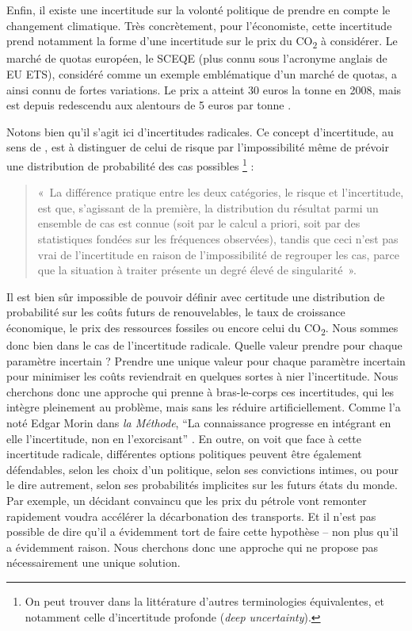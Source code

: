 Enfin, il existe une incertitude sur la volonté politique de prendre en compte le changement climatique. Très concrètement, pour l’économiste, cette incertitude prend notamment la forme d’une incertitude sur le prix du CO\textsubscript{2} à considérer. Le marché de quotas européen, le SCEQE (plus connu sous l’acronyme anglais de EU ETS), considéré comme un exemple emblématique d’un marché de quotas, a ainsi connu de fortes variations. Le prix a atteint 30 euros la tonne en 2008, mais est depuis redescendu aux alentours de 5 euros par tonne \citep{Marcu2016}.

Notons bien qu’il s’agit ici d’incertitudes radicales. Ce concept d’incertitude, au sens de \citet{Knight1921}, est à distinguer de celui de risque par l’impossibilité même de prévoir une distribution de probabilité des cas possibles \footnote{On peut trouver dans la littérature d’autres terminologies équivalentes, et notamment celle d'incertitude profonde (\textit{deep uncertainty}).} :
\begin{quote}
	«~La différence pratique entre les deux catégories, le risque et l’incertitude, est que, s’agissant de la première, la distribution du résultat parmi un ensemble de cas est connue (soit par le calcul a priori, soit par des statistiques fondées sur les fréquences observées), tandis que ceci n’est pas vrai de l’incertitude en raison de l’impossibilité de regrouper les cas, parce que la situation à traiter présente un degré élevé de singularité~»\citep[p. 233]{Knight1921}.
\end{quote}
Il est bien sûr impossible de pouvoir définir avec certitude une distribution de probabilité sur les coûts futurs de renouvelables, le taux de croissance économique, le prix des ressources fossiles ou encore celui du CO\textsubscript{2}. Nous sommes donc bien dans le cas de l’incertitude radicale. Quelle valeur prendre pour chaque paramètre incertain ? Prendre une unique valeur pour chaque paramètre incertain pour minimiser les coûts reviendrait en quelques sortes à nier l’incertitude. Nous cherchons donc une approche qui prenne à bras-le-corps ces incertitudes, qui les intègre pleinement au problème, mais sans les réduire artificiellement. Comme l’a noté Edgar Morin dans \textit{la Méthode}, “La connaissance progresse en intégrant en elle l'incertitude, non en l'exorcisant” \citep{Morin2008}.
En outre, on voit que face à cette incertitude radicale, différentes options politiques peuvent être également défendables, selon les choix d’un politique, selon ses convictions intimes, ou pour le dire autrement, selon ses probabilités implicites sur les futurs états du monde.  Par exemple, un décidant convaincu que les prix du pétrole vont remonter rapidement voudra accélérer la décarbonation des transports. Et il n’est pas possible de dire qu’il a évidemment tort de faire cette hypothèse – non plus qu’il a évidemment raison. Nous cherchons donc une approche qui ne propose pas nécessairement une unique solution.

